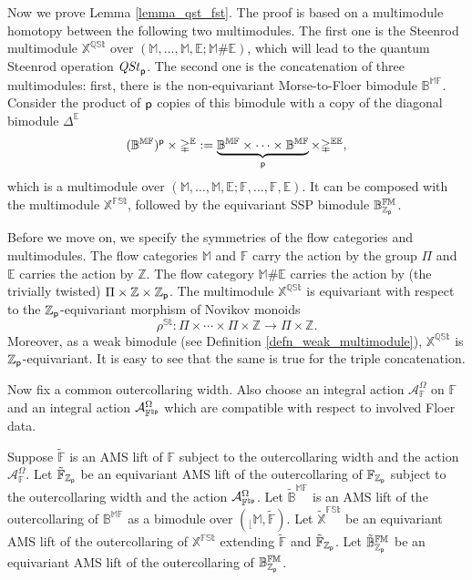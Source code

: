 \documentclass[reqno, 10pt]{amsart}
\numberwithin{equation}{section}
\numberwithin{equation}{section}
\theoremstyle{definition}
\theoremstyle{remark}
\newcommand{\beqn}{\begin{equation*}}
\newcommand{\eeqn}{\end{equation*}}
\newcommand{\mb}{\mathbb}
\newcommand{\mc}{\mathcal}
\newcommand{\p}{{\sf p}}
\newcommand{\zp}{{{\mb Z}_{\sf p}}}
\newcommand{\ep}{{{\mathbb E}}}
\renewcommand{\outer}{{}_{\lfloor}}
\newcommand{\qst}{{\it QSt}_{\p}}
\begin{document}
Now we prove Lemma \ref{lemma_qst_fst}. The proof is based on a multimodule homotopy between the following two multimodules. The first one is the Steenrod multimodule $\mb{X}^{\mb{QSt}}$ over $(\mb{M}, \ldots, \mb{M}, \ep; \mb{M}\# \ep)$, which will lead to the quantum Steenrod operation $\qst$. The second one is the concatenation of three multimodules: first, there is the non-equivariant Morse-to-Floer bimodule $\mb{B}^{\mb{MF}}$. Consider the product of $\p$ copies of this bimodule with a copy of the diagonal bimodule $\mb{\Delta}^{\ep}$
\beqn
(\mb{B}^{\mb{MF}})^\p \times \mb{\Delta}^{\ep}:= \underbrace{\mb{B}^{\mb{MF}}\times \cdots \times \mb{B}^{\mb{MF}}}_{\p} \times \mb{\Delta}^{\ep \ep},
\eeqn
which is a multimodule over $(\mb{M}, \ldots, {\mb M}, \ep; \mb{F}, \ldots, \mb{F}, \ep)$. It can be composed with the multimodule ${\mb X}^{\mb{FSt}}$, followed by the equivariant SSP bimodule ${\mb B}_{\zp}^{\mb{FM}}$. 





Before we move on, we specify the symmetries of the flow categories and multimodules. The flow categories ${\mb M}$ and ${\mb F}$ carry the action by the group $\Pi$ and $\ep$ carries the action by ${\mb Z}$. The flow category $\mb{M}\# \ep$ carries the action by (the trivially twisted) $\Pi \times \mb{Z} \times \zp$. The multimodule $\mb{X}^{\mb{QSt}}$ is equivariant with respect to the $\zp$-equivariant morphism of Novikov monoids
\beqn
\rho^{\mb{St}}: \Pi \times \cdots \times \Pi \times {\mb Z} \to \Pi \times {\mb Z}.
\eeqn
Moreover, as a weak bimodule (see Definition \ref{defn_weak_multimodule}), $\mb{X}^{\mb{QSt}}$ is $\zp$-equivariant. It is easy to see that the same is true for the triple concatenation. 

Now fix a common outercollaring width. Also choose an integral action ${\mc A}_{\mb F}^\Omega$ on ${\mb F}$ and an integral action ${\mc A}_{{\mb F}^{\natural \p}}^\Omega$ which are compatible with respect to involved Floer data. 

Suppose $\tilde {\mb F}$ is an AMS lift of ${\mb F}$ subject to the outercollaring width and the action ${\mc A}_{\mb F}^\Omega$. Let $\tilde{\mb F}_\zp$ be an equivariant AMS lift of the outercollaring of ${\mb F}_\zp$ subject to the outercollaring width and the action ${\mc A}_{{\mb F}^{\natural \p}}^\Omega$. Let $\tilde{\mb B}^{\mb{MF}}$ is an AMS lift of the outercollaring of $\mb{B}^{\mb{MF}}$ as a bimodule over $(\outer {\mb M}, \tilde{\mb F})$. Let $\tilde{\mb X}^{\mb{FSt}}$ be an equivariant AMS lift of the outercollaring of ${\mb X}^{\mb{FSt}}$ extending $\tilde{\mb F}$ and $\tilde{\mb F}_{\zp}$. Let $\tilde{\mb B}_{\zp}^{\mb{FM}}$ be an equivariant AMS lift of the outercollaring of ${\mb B}_{\zp}^{\mb{FM}}$. 
\end{document}
